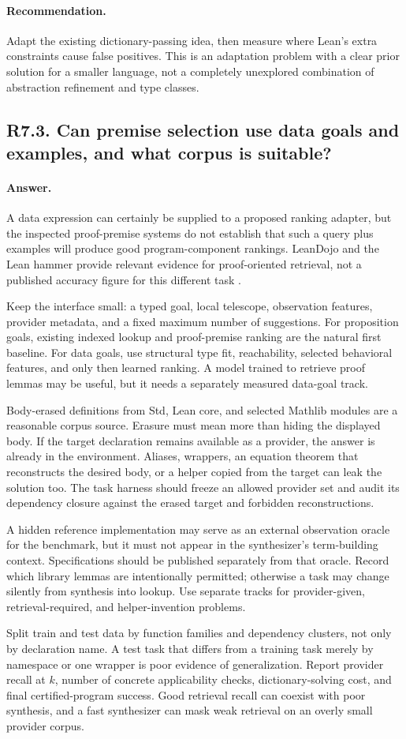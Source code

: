 \documentclass[11pt,a4paper]{article}
\newcommand{\answer}{\paragraph{Answer.}}
\newcommand{\recommend}{\paragraph{Recommendation.}}
\theoremstyle{definition}
\theoremstyle{remark}
\begin{document}
\recommend Adapt the existing dictionary-passing idea, then measure where Lean's
extra constraints cause false positives. This is an adaptation problem with a
clear prior solution for a smaller language, not a completely unexplored
combination of abstraction refinement and type classes.

\subsection{R7.3. Can premise selection use data goals and examples, and what corpus is suitable?}
\answer A data expression can certainly be supplied to a proposed ranking adapter,
but the inspected proof-premise systems do not establish that such a query plus
examples will produce good program-component rankings. LeanDojo and the Lean
hammer provide relevant evidence for proof-oriented retrieval, not a published
accuracy figure for this different task \cite{leandojo,leanhammer}.

Keep the interface small: a typed goal, local telescope, observation features,
provider metadata, and a fixed maximum number of suggestions. For proposition
goals, existing indexed lookup and proof-premise ranking are the natural first
baseline. For data goals, use structural type fit, reachability, selected
behavioral features, and only then learned ranking. A model trained to retrieve
proof lemmas may be useful, but it needs a separately measured data-goal track.

Body-erased definitions from Std, Lean core, and selected Mathlib modules are a
reasonable corpus source. Erasure must mean more than hiding the displayed body.
If the target declaration remains available as a provider, the answer is already
in the environment. Aliases, wrappers, an equation theorem that reconstructs
the desired body, or a helper copied from the target can leak the solution too.
The task harness should freeze an allowed provider set and audit its dependency
closure against the erased target and forbidden reconstructions.

A hidden reference implementation may serve as an external observation oracle
for the benchmark, but it must not appear in the synthesizer's term-building
context. Specifications should be published separately from that oracle. Record
which library lemmas are intentionally permitted; otherwise a task may change
silently from synthesis into lookup. Use separate tracks for provider-given,
retrieval-required, and helper-invention problems.

Split train and test data by function families and dependency clusters, not
only by declaration name. A test task that differs from a training task merely
by namespace or one wrapper is poor evidence of generalization. Report provider
recall at $k$, number of concrete applicability checks, dictionary-solving cost,
and final certified-program success. Good retrieval recall can coexist with
poor synthesis, and a fast synthesizer can mask weak retrieval on an overly
small provider corpus.
\end{document}
